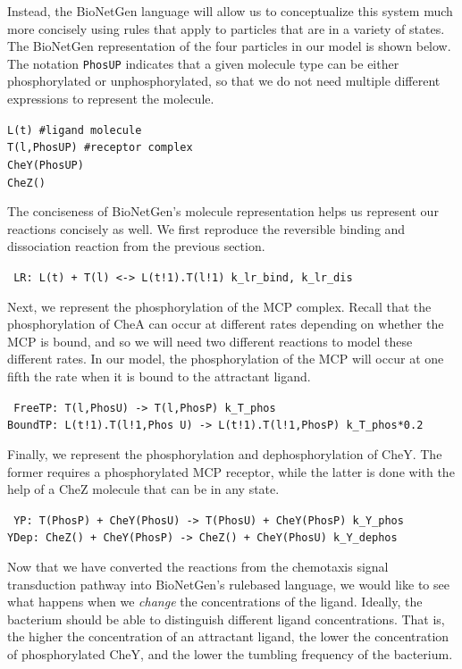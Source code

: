 Instead, the BioNetGen language will allow us to conceptualize this system much more concisely using rules that apply to particles that are in a variety of states. The BioNetGen representation of the four particles in our model is shown below. The notation \texttt{Phos\texttildelow U\texttildelow P} indicates that a given molecule type can be either phosphorylated or unphosphorylated, so that we do not need multiple different expressions to represent the molecule.

\texttt{L(t)             \#ligand molecule \\
    T(l,Phos\texttildelow U\texttildelow P)    \#receptor complex   \\
		CheY(Phos\texttildelow U\texttildelow P) \\
		CheZ()}

The conciseness of BioNetGen's molecule representation helps us represent our reactions concisely as well. We first reproduce the reversible binding and dissociation reaction from the previous section.

\texttt{
LR: L(t) + T(l) <-> L(t!1).T(l!1) k\_lr\_bind, k\_lr\_dis
}

Next, we represent the phosphorylation of the MCP complex. Recall that the phosphorylation of CheA can occur at different rates depending on whether the MCP is bound, and so we will need two different reactions to model these different rates. In our model, the phosphorylation of the MCP will occur at one fifth the rate when it is bound to the attractant ligand.

\texttt{
FreeTP: T(l,Phos\texttildelow U) -> T(l,Phos\texttildelow P) k\_T\_phos   \\
BoundTP: L(t!1).T(l!1,Phos~U) -> L(t!1).T(l!1,Phos\texttildelow P) k\_T\_phos*0.2
}

Finally, we represent the phosphorylation and dephosphorylation of CheY. The former requires a phosphorylated MCP receptor, while the latter is done with the help of a CheZ molecule that can be in any state.

\texttt{
YP: T(Phos\texttildelow P) + CheY(Phos\texttildelow U) -> T(Phos\texttildelow U) + CheY(Phos\texttildelow P) k\_Y\_phos \\
YDep: CheZ() + CheY(Phos\texttildelow P) -> CheZ() + CheY(Phos\texttildelow U) k\_Y\_dephos
}

Now that we have converted the reactions from the chemotaxis signal transduction pathway into BioNetGen's rule\-based language, we would like to see what happens when we \textit{change} the concentrations of the ligand. Ideally, the bacterium should be able to distinguish different ligand concentrations. That is, the higher the concentration of an attractant ligand, the lower the concentration of phosphorylated CheY, and the lower the tumbling frequency of the bacterium.

